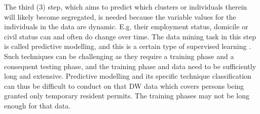 The third (3) step, which aims to predict which clusters or individuals therein will likely become segregated, 
is needed because the variable values for the individuals in the data are dynamic. 
E.g. their employment status, domicile or civil status can and often do change over time. 
The data mining task in this step is called predictive modelling, and this is a certain type of supervised learning \cite[chapter~34.2]{CourseLitt}. 
Such techniques can be challenging as they require a training phase and a consequent testing phase, 
and the training phase and data need to be sufficiently long and extensive. 
Predictive modelling and its specific technique classification can thus be difficult to conduct on that DW data which 
covers persons being granted only temporary resident permits. The training phases may not be long enough for that data.    